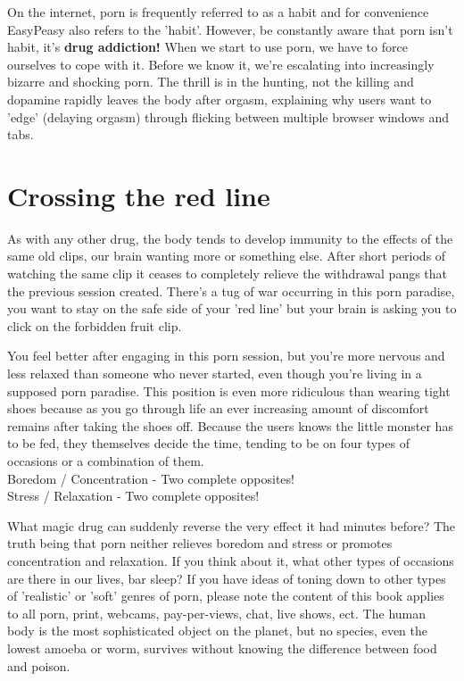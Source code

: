 \documentclass[easypeasy.tex]{subfiles}
\begin{document}
On the internet, porn is frequently referred to as a habit and for convenience EasyPeasy also refers to the 'habit'. However, be constantly aware that porn isn't habit, it's \textbf{drug addiction!} When we start to use porn, we have to force ourselves to cope with it. Before we know it, we're escalating into increasingly bizarre and shocking porn. The thrill is in the hunting, not the killing and dopamine rapidly leaves the body after orgasm, explaining why users want to 'edge' (delaying orgasm) through flicking between multiple browser windows and tabs.

\section{Crossing the red line}
As with any other drug, the body tends to develop immunity to the effects of the same old clips, our brain wanting more or something else. After short periods of watching the same clip it ceases to completely relieve the withdrawal pangs that the previous session created. There's a tug of war occurring in this porn paradise, you want to stay on the safe side of your 'red line' but your brain is asking you to click on the forbidden fruit clip.

You feel better after engaging in this porn session, but you're more nervous and less relaxed than someone who never started, even though you're living in a supposed porn paradise. This position is even more ridiculous than wearing tight shoes because as you go through life an ever increasing amount of discomfort remains after taking the shoes off. Because the users knows the little monster has to be fed, they themselves decide the time, tending to be on four types of occasions or a combination of them. \\
  Boredom / Concentration - Two complete opposites! \\
  Stress / Relaxation - Two complete opposites!

What magic drug can suddenly reverse the very effect it had minutes before? The truth being that porn neither relieves boredom and stress or promotes concentration and relaxation. If you think about it, what other types of occasions are there in our lives, bar sleep? If you have ideas of toning down to other types of 'realistic' or 'soft' genres of porn, please note the content of this book applies to all porn, print, webcams, pay-per-views, chat, live shows, ect. The human body is the most sophisticated object on the planet, but no species, even the lowest amoeba or worm, survives without knowing the difference between food and poison.
\end{document}
